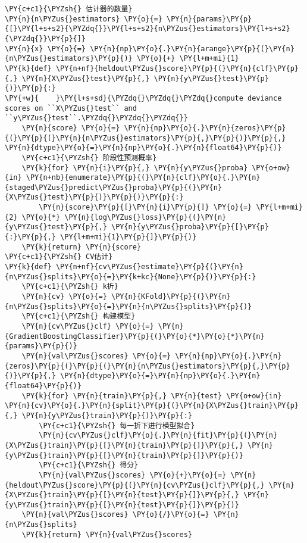 \begin{Verbatim}[commandchars=\\\{\}]
\PY{c+c1}{\PYZsh{} 估计器的数量}
\PY{n}{n\PYZus{}estimators} \PY{o}{=} \PY{n}{params}\PY{p}{[}\PY{l+s+s2}{\PYZdq{}}\PY{l+s+s2}{n\PYZus{}estimators}\PY{l+s+s2}{\PYZdq{}}\PY{p}{]}
\PY{n}{x} \PY{o}{=} \PY{n}{np}\PY{o}{.}\PY{n}{arange}\PY{p}{(}\PY{n}{n\PYZus{}estimators}\PY{p}{)} \PY{o}{+} \PY{l+m+mi}{1}
\PY{k}{def} \PY{n+nf}{heldout\PYZus{}score}\PY{p}{(}\PY{n}{clf}\PY{p}{,} \PY{n}{X\PYZus{}test}\PY{p}{,} \PY{n}{y\PYZus{}test}\PY{p}{)}\PY{p}{:}
\PY{+w}{    }\PY{l+s+sd}{\PYZdq{}\PYZdq{}\PYZdq{}compute deviance scores on ``X\PYZus{}test`` and ``y\PYZus{}test``.\PYZdq{}\PYZdq{}\PYZdq{}}
    \PY{n}{score} \PY{o}{=} \PY{n}{np}\PY{o}{.}\PY{n}{zeros}\PY{p}{(}\PY{p}{(}\PY{n}{n\PYZus{}estimators}\PY{p}{,}\PY{p}{)}\PY{p}{,} \PY{n}{dtype}\PY{o}{=}\PY{n}{np}\PY{o}{.}\PY{n}{float64}\PY{p}{)}
    \PY{c+c1}{\PYZsh{} 阶段性预测概率}
    \PY{k}{for} \PY{n}{i}\PY{p}{,} \PY{n}{y\PYZus{}proba} \PY{o+ow}{in} \PY{n+nb}{enumerate}\PY{p}{(}\PY{n}{clf}\PY{o}{.}\PY{n}{staged\PYZus{}predict\PYZus{}proba}\PY{p}{(}\PY{n}{X\PYZus{}test}\PY{p}{)}\PY{p}{)}\PY{p}{:}
        \PY{n}{score}\PY{p}{[}\PY{n}{i}\PY{p}{]} \PY{o}{=} \PY{l+m+mi}{2} \PY{o}{*} \PY{n}{log\PYZus{}loss}\PY{p}{(}\PY{n}{y\PYZus{}test}\PY{p}{,} \PY{n}{y\PYZus{}proba}\PY{p}{[}\PY{p}{:}\PY{p}{,} \PY{l+m+mi}{1}\PY{p}{]}\PY{p}{)}
    \PY{k}{return} \PY{n}{score}
\PY{c+c1}{\PYZsh{} CV估计}
\PY{k}{def} \PY{n+nf}{cv\PYZus{}estimate}\PY{p}{(}\PY{n}{n\PYZus{}splits}\PY{o}{=}\PY{k+kc}{None}\PY{p}{)}\PY{p}{:}
    \PY{c+c1}{\PYZsh{} k折}
    \PY{n}{cv} \PY{o}{=} \PY{n}{KFold}\PY{p}{(}\PY{n}{n\PYZus{}splits}\PY{o}{=}\PY{n}{n\PYZus{}splits}\PY{p}{)}
    \PY{c+c1}{\PYZsh{} 构建模型}
    \PY{n}{cv\PYZus{}clf} \PY{o}{=} \PY{n}{GradientBoostingClassifier}\PY{p}{(}\PY{o}{*}\PY{o}{*}\PY{n}{params}\PY{p}{)}
    \PY{n}{val\PYZus{}scores} \PY{o}{=} \PY{n}{np}\PY{o}{.}\PY{n}{zeros}\PY{p}{(}\PY{p}{(}\PY{n}{n\PYZus{}estimators}\PY{p}{,}\PY{p}{)}\PY{p}{,} \PY{n}{dtype}\PY{o}{=}\PY{n}{np}\PY{o}{.}\PY{n}{float64}\PY{p}{)}
    \PY{k}{for} \PY{n}{train}\PY{p}{,} \PY{n}{test} \PY{o+ow}{in} \PY{n}{cv}\PY{o}{.}\PY{n}{split}\PY{p}{(}\PY{n}{X\PYZus{}train}\PY{p}{,} \PY{n}{y\PYZus{}train}\PY{p}{)}\PY{p}{:}
        \PY{c+c1}{\PYZsh{} 每一折下进行模型拟合}
        \PY{n}{cv\PYZus{}clf}\PY{o}{.}\PY{n}{fit}\PY{p}{(}\PY{n}{X\PYZus{}train}\PY{p}{[}\PY{n}{train}\PY{p}{]}\PY{p}{,} \PY{n}{y\PYZus{}train}\PY{p}{[}\PY{n}{train}\PY{p}{]}\PY{p}{)}
        \PY{c+c1}{\PYZsh{} 得分}
        \PY{n}{val\PYZus{}scores} \PY{o}{+}\PY{o}{=} \PY{n}{heldout\PYZus{}score}\PY{p}{(}\PY{n}{cv\PYZus{}clf}\PY{p}{,} \PY{n}{X\PYZus{}train}\PY{p}{[}\PY{n}{test}\PY{p}{]}\PY{p}{,} \PY{n}{y\PYZus{}train}\PY{p}{[}\PY{n}{test}\PY{p}{]}\PY{p}{)}
    \PY{n}{val\PYZus{}scores} \PY{o}{/}\PY{o}{=} \PY{n}{n\PYZus{}splits}
    \PY{k}{return} \PY{n}{val\PYZus{}scores}


\end{Verbatim}
